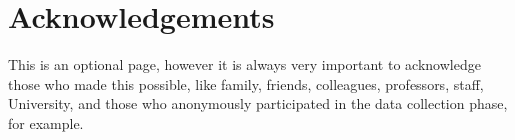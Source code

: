\chapter*{Acknowledgements}

This is an optional page, however it is always very important to acknowledge those who
made this possible, like family, friends, colleagues, professors, staff, University, and those
who anonymously participated in the data collection phase, for example.